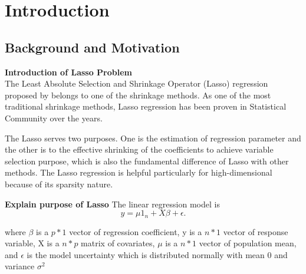 \chapter{Introduction}
\label{Chapter1}
\section{Background and Motivation}




\textbf{Introduction of Lasso Problem}\\
The Least Absolute Selection and Shrinkage Operator (Lasso) regression proposed by \cite{tibshirani_1996} belongs to one of the shrinkage methods. As one of the most traditional shrinkage methods, Lasso regression has been proven in Statistical Community over the years.

The Lasso serves two purposes. One is the estimation of regression parameter and the other is to the effective shrinking of the coefficients to achieve variable selection purpose, which is also the fundamental difference of Lasso with other methods. The Lasso regression is helpful particularly for high-dimensional because of its sparsity nature.

\textbf{Explain purpose of Lasso}
The linear regression model is
\begin{equation}
	\label{eq:LRmodel}
	y = \mu 1_n + X\beta + \epsilon.
\end{equation} 

where $\beta$ is a $p*1$ vector of regression coefficient, y is a $n*1$ vector of response variable, X is a $n*p$ matrix of covariates, $\mu$ is a $n*1$ vector of population mean, and $\epsilon$ is the model uncertainty which is distributed normally with mean 0 and variance $\sigma^2$

